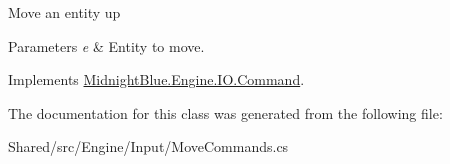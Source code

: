 Move an entity up 


\begin{DoxyParams}{Parameters}
{\em e} & Entity to move.\\
\hline
\end{DoxyParams}


Implements \hyperlink{class_midnight_blue_1_1_engine_1_1_i_o_1_1_command_ae641d2c1a9db17f03ee6b7854b00a9d2}{Midnight\+Blue.\+Engine.\+I\+O.\+Command}.



The documentation for this class was generated from the following file\+:\begin{DoxyCompactItemize}
\item 
Shared/src/\+Engine/\+Input/Move\+Commands.\+cs\end{DoxyCompactItemize}
